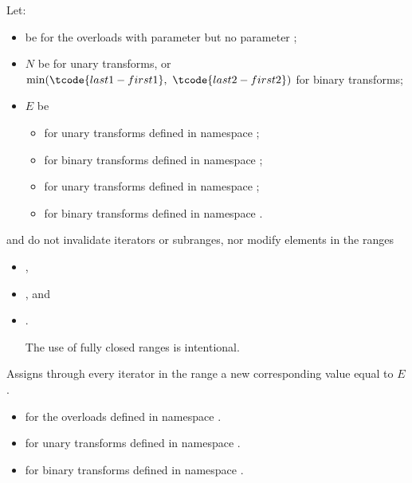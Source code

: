 \begin{itemdescr}
\pnum
Let:
\begin{itemize}
\setlength{\emergencystretch}{1em}
\item
   be 
  for the overloads with parameter 
  but no parameter ;
\item
  $N$ be  for unary transforms, or
  $\min(\tcode{last1 - first1}, \ \tcode{last2 - first2})$ for binary transforms;
\item
  $E$ be
  \begin{itemize}
  \item
    for unary transforms defined in namespace ;
  \item
    for binary transforms defined in namespace ;
  \item
    for unary transforms defined in namespace ;
  \item
    for binary transforms defined in namespace .
  \end{itemize}
\end{itemize}

\pnum
\expects
{} and  do not invalidate iterators or subranges, nor
modify elements in the ranges
\begin{itemize}
\item {},
\item {}, and
\item {}.
\begin{footnote}
The use of fully closed ranges is intentional.
\end{footnote}
\end{itemize}

\pnum
\effects
Assigns through every iterator 
in the range 
a new corresponding value equal to $E$.

\pnum
\returns
\begin{itemize}
\item
  for the overloads defined in namespace .
\item
  for unary transforms defined in namespace .
\item
  for binary transforms defined in namespace .
\end{itemize}


\end{itemdescr}
